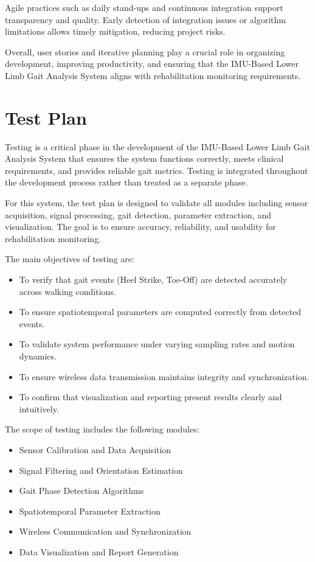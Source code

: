 \documentclass[12pt,a4paper]{report}
\begin{document}
Agile practices such as daily stand-ups and continuous integration support transparency and quality. Early detection of integration issues or algorithm limitations allows timely mitigation, reducing project risks.

Overall, user stories and iterative planning play a crucial role in organizing development, improving productivity, and ensuring that the IMU-Based Lower Limb Gait Analysis System aligns with rehabilitation monitoring requirements.

\section{Test Plan}

Testing is a critical phase in the development of the IMU-Based Lower Limb Gait Analysis System that ensures the system functions correctly, meets clinical requirements, and provides reliable gait metrics. Testing is integrated throughout the development process rather than treated as a separate phase.

For this system, the test plan is designed to validate all modules including sensor acquisition, signal processing, gait detection, parameter extraction, and visualization. The goal is to ensure accuracy, reliability, and usability for rehabilitation monitoring.

The main objectives of testing are:
\begin{itemize}
    \item To verify that gait events (Heel Strike, Toe-Off) are detected accurately across walking conditions.
    \item To ensure spatiotemporal parameters are computed correctly from detected events.
    \item To validate system performance under varying sampling rates and motion dynamics.
    \item To ensure wireless data transmission maintains integrity and synchronization.
    \item To confirm that visualization and reporting present results clearly and intuitively.
\end{itemize}

The scope of testing includes the following modules:
\begin{itemize}
    \item Sensor Calibration and Data Acquisition
    \item Signal Filtering and Orientation Estimation
    \item Gait Phase Detection Algorithms
    \item Spatiotemporal Parameter Extraction
    \item Wireless Communication and Synchronization
    \item Data Visualization and Report Generation
\end{itemize}
\end{document}
